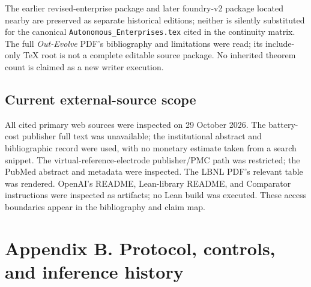 The earlier revised-enterprise package and later foundry-v2 package
located nearby are preserved as separate historical editions; neither is
silently substituted for the canonical
\texttt{Autonomous\_Enterprises.tex} cited in the continuity matrix. The
full \emph{Out-Evolve} PDF's bibliography and limitations were read; its
include-only TeX root is not a complete editable source package. No
inherited theorem count is claimed as a new writer execution.

\subsection*{Current external-source
scope}\label{current-external-source-scope}

All cited primary web sources were inspected on 29 October 2026. The
battery-cost publisher full text was unavailable; the institutional
abstract and bibliographic record were used, with no monetary estimate
taken from a search snippet. The virtual-reference-electrode
publisher/PMC path was restricted; the PubMed abstract and metadata were
inspected. The LBNL PDF's relevant table was rendered. OpenAI's README,
Lean-library README, and Comparator instructions were inspected as
artifacts; no Lean build was executed. These access boundaries appear in
the bibliography and claim map.

\section*{Appendix B. Protocol, controls, and inference
history}\label{appendix-protocol}

